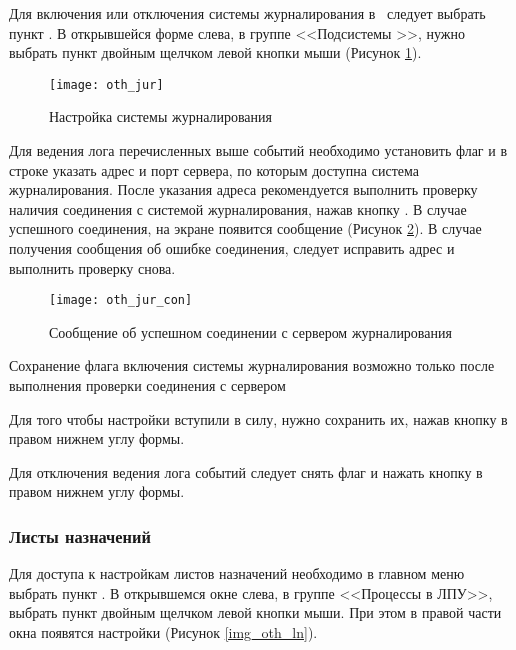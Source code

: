 Для включения или отключения системы журналирования в \tmis~следует выбрать пункт . В открывшейся форме слева, в группе <<Подсистемы \tmis>>, нужно выбрать пункт  двойным щелчком левой кнопки мыши (Рисунок \ref{img_oth_jur}).

\begin{figure}[ht]\centering
 \texttt{[image: oth\_jur]}
 \caption{Настройка системы журналирования}
 \label{img_oth_jur}
\end{figure}

Для ведения лога перечисленных выше событий необходимо установить флаг  и в строке  указать адрес и порт сервера, по которым доступна система журналирования. После указания адреса рекомендуется выполнить проверку наличия соединения с системой журналирования, нажав кнопку  . В случае успешного соединения, на экране появится сообщение (Рисунок \ref{img_oth_jur_con}). В случае получения сообщения об ошибке соединения, следует исправить адрес и выполнить проверку снова.

\begin{figure}[ht]\centering
 \texttt{[image: oth\_jur\_con]}
 \caption{Сообщение об успешном соединении с сервером журналирования}
 \label{img_oth_jur_con}
\end{figure}

\begin{vnim}
Сохранение флага включения системы журналирования возможно только после выполнения проверки соединения с сервером
\end{vnim}

Для того чтобы настройки вступили в силу, нужно сохранить их, нажав кнопку   в правом нижнем углу формы.

Для отключения ведения лога событий следует снять флаг  и нажать кнопку  в правом нижнем углу формы.

\subsubsection{Листы назначений} 

Для доступа к настройкам листов назначений необходимо в главном меню выбрать пункт . В открывшемся окне слева, в группе <<Процессы в ЛПУ>>, выбрать пункт  двойным щелчком левой кнопки мыши. При этом в правой части окна появятся настройки (Рисунок \ref{img_oth_ln}).

